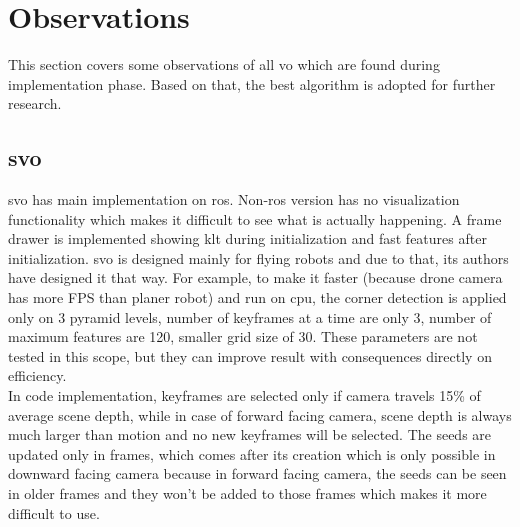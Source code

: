 \section{Observations}
This section covers some observations of all \acrshort{vo} which are found during implementation phase. Based on that, the best algorithm is adopted for further research.

\subsection{\acrshort{svo}}
\acrshort{svo} has main implementation on \acrshort{ros}. Non-\acrshort{ros} version has no visualization functionality which makes it difficult to see what is actually happening. A frame drawer is implemented showing \acrshort{klt} during initialization and \acrshort{fast} features after initialization. \acrshort{svo} is designed mainly for flying robots and due to that, its authors have designed it that way. For example, to make it faster (because drone camera has more FPS than planer robot) and run on \acrshort{cpu}, the corner detection is applied only on 3 pyramid levels, number of keyframes at a time are only 3, number of maximum features are 120, smaller grid size of 30. These parameters are not tested in this scope, but they can improve result with consequences directly on efficiency.\\
\newline In code implementation, keyframes are selected only if camera travels 15\% of average scene depth, while in case of forward facing camera, scene depth is always much larger than motion and no new keyframes will be selected. The seeds are updated only in frames, which comes after its creation which is only possible in downward facing camera because in forward facing camera, the seeds can be seen in older frames and they won't be added to those frames which makes it more difficult to use.

